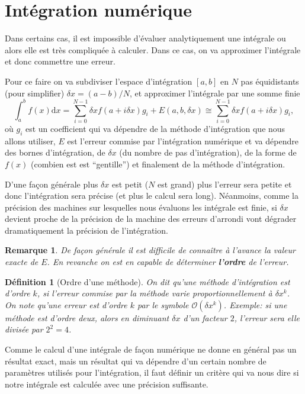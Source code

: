 \documentclass[a4paper,12pt]{book}
\newcommand{\dd}{\mathrm{d}}
\newtheorem{definition}{Définition}
\newtheorem*{remarque}{Remarque}
\begin{document}
\section{Intégration numérique}

Dans certains cas, il est impossible d'évaluer analytiquement une intégrale ou alors elle est très compliquée à calculer.
Dans ce cas, on va approximer l'intégrale et donc commettre une erreur.

Pour ce faire on va subdiviser l'espace d'intégration $[a,b]$ en $N$ pas équidistants (pour simplifier) $\delta x=(a-b)/N$,
et approximer l'intégrale par une somme finie
\begin{equation}
 \int_a^bf(x)\dd x=\sum_{i=0}^{N-1} \delta x f(a+i\delta x) g_i+E(a,b,\delta x)\cong\sum_{i=0}^{N-1} \delta x f(a+i\delta x) g_i,
\end{equation}
où $g_i$ est un coefficient qui va dépendre de la méthode d'intégration 
que nous allons utiliser, $E$ est l'erreur commise par l'intégration numérique et va dépendre des bornes d'intégration, 
de $\delta x$ (du nombre de pas d'intégration), de la forme de $f(x)$ (combien est est ``gentille'') et finalement de
la méthode d'intégration.

D'une façon générale plus $\delta x$ est petit ($N$ est grand) plus l'erreur sera petite et donc l'intégration sera précise
(et plus le calcul sera long).
Néanmoins, comme la précision des machines sur lesquelles nous évaluons les intégrale est finie, si $\delta x$ devient 
proche de la précision de la machine des erreurs d'arrondi vont dégrader dramatiquement la précision de l'intégration.

\begin{remarque}
De façon générale il est difficile de connaître à l'avance la valeur exacte de $E$. En revanche on est
en capable de déterminer \textbf{l'ordre} de l'erreur.
\end{remarque}

\begin{definition}[Ordre d'une méthode]
 On dit qu'une méthode d'intégration est d'ordre $k$, si l'erreur commise par la méthode varie 
 proportionnellement à $\delta x^k$. On note qu'une erreur est d'ordre $k$ par le symbole $\mathcal{O}(\delta x^k)$. Exemple: si une méthode est d'ordre deux, alors en diminuant 
 $\delta x$ d'un facteur $2$, l'erreur sera elle divisée par $2^2=4$.
\end{definition}

Comme le calcul d'une intégrale de façon numérique ne donne en général pas un résultat exact, mais
un résultat qui va dépendre d'un certain nombre de paramètres utilisés pour l'intégration, il faut
définir un critère qui va nous dire si notre intégrale est calculée avec une précision suffisante.
\end{document}
